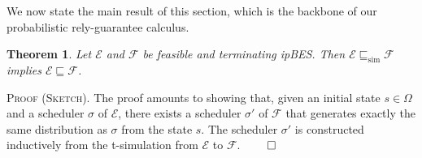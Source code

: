 \documentclass[review]{elsart}
\newtheorem{theorem}[definition]{Theorem}
\newenvironment{proofsummary}{\par
\noindent
\textsc{Proof (Sketch). }
\noindent}{\hfill\(\qed\)}
\newcommand{\EE}{\mathcal{E}}
\newcommand{\FF}{\mathcal{F}}
\newcommand{\refby}{\sqsubseteq}
\newcommand{\simref}{\refby_{\mathrm{sim}}}
\begin{document}
We now state the main result of this section, which is the backbone of our probabilistic rely-guarantee calculus. 


\begin{theorem}\label{thm:trace-imply-distribution}
Let $\EE$ and $\FF$ be feasible and terminating ipBES. Then $\EE\simref\FF$ implies $\EE\refby\FF$.
\end{theorem}

\begin{proofsummary}
The proof amounts to showing that, given an initial state $s{\in}\Omega$ and a scheduler $\sigma$ of $\EE$, there exists a scheduler $\sigma'$ of $\FF$ that generates exactly the same distribution as $\sigma$ from the state $s$. The scheduler $\sigma'$ is  constructed  inductively from the t-simulation from $\EE$ to $\FF$. 
\end{proofsummary}
\end{document}
